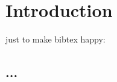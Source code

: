 
\chapter{Introduction}
\label{chapter:introduction}
just to make bibtex happy: \cite{Berend2006}
\section{...}
